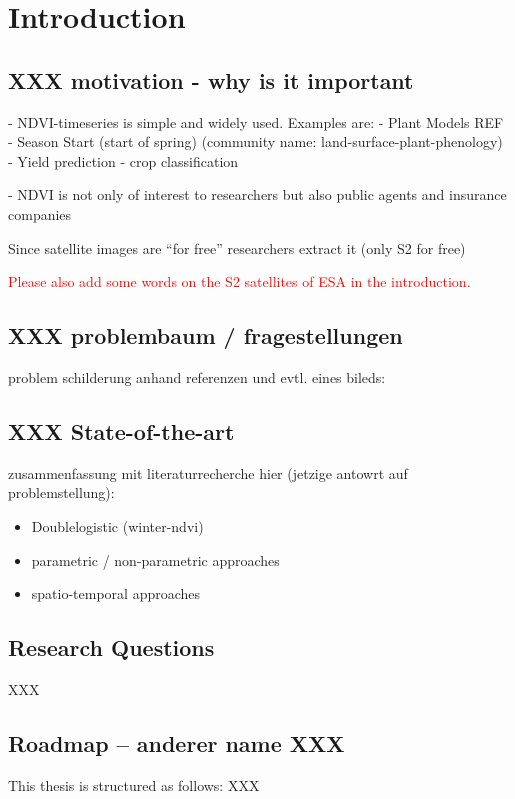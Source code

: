 \chapter{Introduction}

\section{XXX motivation - why is it important}{
    - NDVI-timeseries is simple and widely used. 
        Examples are: 
            - Plant Models REF
            - Season Start (start of spring) (community name: land-surface-plant-phenology)
            - Yield prediction
            - crop classification
    
    - NDVI is not only of interest to researchers but also public agents and insurance companies
    
    Since satellite images are ``for free'' researchers extract it (only S2 for free)
    
    \textcolor{red}{Please also add some words on the S2 satellites of ESA in the introduction.} 
}


\section{XXX problembaum / fragestellungen}{
    problem schilderung anhand referenzen und evtl. eines bileds:
}



\section{XXX State-of-the-art}{
    zusammenfassung mit literaturrecherche hier (jetzige antowrt auf problemstellung):
    \begin{itemize}
        \item Doublelogistic (winter-ndvi)
        \item parametric / non-parametric approaches
        \item spatio-temporal approaches
    \end{itemize}
}

\section{Research Questions}
XXX

\section{Roadmap -- anderer name XXX}{
    This thesis is structured as follows: XXX
}

